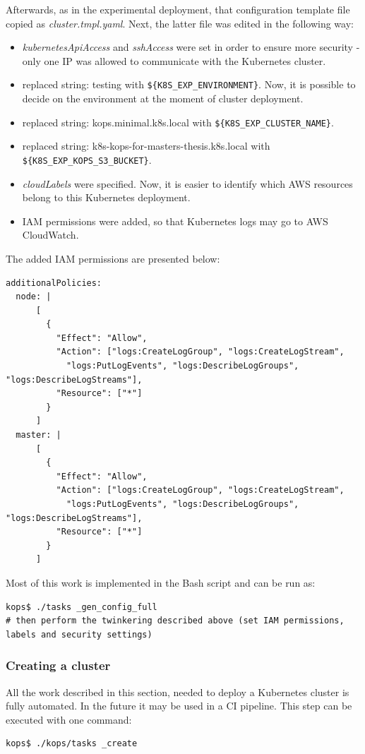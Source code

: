 Afterwards, as in the experimental deployment, that configuration template file copied as \textit{cluster.tmpl.yaml}. Next, the latter file was edited in the following way:
\begin{itemize}
\item \textit{kubernetesApiAccess} and \textit{sshAccess} were set in order to ensure more security - only one IP was allowed to communicate with the Kubernetes cluster.
\item replaced string: testing with \verb|${K8S_EXP_ENVIRONMENT}|. Now, it is possible to decide on the environment at the moment of cluster deployment.
\item replaced string: kops.minimal.k8s.local with \verb|${K8S_EXP_CLUSTER_NAME}|.
\item replaced string: k8s-kops-for-masters-thesis.k8s.local with \verb|${K8S_EXP_KOPS_S3_BUCKET}|.
\item \textit{cloudLabels} were specified. Now, it is easier to identify which AWS resources belong to this Kubernetes deployment\cite{online-kops-labels}.
\item IAM permissions were added, so that Kubernetes logs may go to AWS CloudWatch.
\end{itemize}

The added IAM permissions are presented below:
\begin{lstlisting}[basicstyle=\tiny,caption={IAM permissions added to kops cluster template needed for logging}]
additionalPolicies:
  node: |
      [
        {
          "Effect": "Allow",
          "Action": ["logs:CreateLogGroup", "logs:CreateLogStream",
            "logs:PutLogEvents", "logs:DescribeLogGroups", "logs:DescribeLogStreams"],
          "Resource": ["*"]
        }
      ]
  master: |
      [
        {
          "Effect": "Allow",
          "Action": ["logs:CreateLogGroup", "logs:CreateLogStream",
            "logs:PutLogEvents", "logs:DescribeLogGroups", "logs:DescribeLogStreams"],
          "Resource": ["*"]
        }
      ]
\end{lstlisting}

Most of this work is implemented in the Bash script and can be run as:
\begin{lstlisting}[basicstyle=\tiny,caption={Bash commands automating cluster configuration generation}]
kops$ ./tasks _gen_config_full
# then perform the twinkering described above (set IAM permissions, labels and security settings)
\end{lstlisting}

\subsubsection{Creating a cluster}
\label{kops-creating-the-cluster}
All the work described in this section, needed to deploy a Kubernetes cluster is fully automated. In the future it may be used in a CI pipeline. This step can be executed with one command:
\begin{lstlisting}[basicstyle=\tiny,caption={Bash command automating cluster creating}]
kops$ ./kops/tasks _create
\end{lstlisting}

